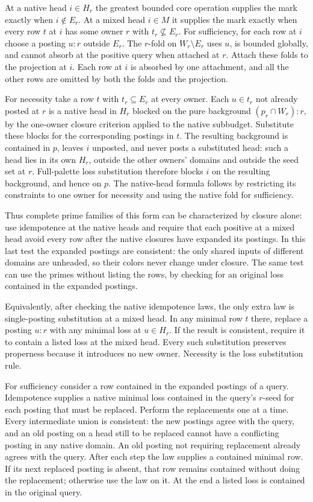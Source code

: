 At a native head $i\in H_r$ the greatest bounded core
operation supplies the mark exactly when $i\notin E_r$.
At a mixed head $i\in M$ it supplies the mark exactly when
every row $t$ at $i$ has some owner $r$ with
$t_r\not\subseteq E_r$. For sufficiency, for each row
at $i$ choose a posting $u:r$ outside $E_r$. The
$r$-fold on $W_r\setminus E_r$ uses $u$, is bounded
globally, and cannot absorb at the positive query when
attached at $r$. Attach these folds to the projection
at $i$. Each row at $i$ is absorbed by one attachment,
and all the other rows are omitted by both the folds
and the projection.

For necessity take a row $t$ with $t_r\subseteq E_r$
at every owner. Each $u\in t_r$ not already posted at $r$
is a native head in $H_r$ blocked on the pure background
$(p_r\cap W_r):r$, by the one-owner closure criterion
applied to the native subbudget. Substitute these
blocks for the corresponding postings in $t$. The
resulting background is contained in $p$, leaves $i$
unposted, and never posts a substituted head: such a
head lies in its own $H_r$, outside the other owners'
domains and outside the seed set at $r$. Full-palette
loss substitution therefore blocks $i$ on the resulting
background, and hence on $p$. The native-head formula
follows by restricting its constraints to one owner for
necessity and using the native fold for sufficiency.

Thus complete prime families of this form can be
characterized by closure alone: use idempotence at the
native heads and require that each positive at a mixed
head avoid every row after the native closures have
expanded its postings. In this last test the expanded
postings are consistent: the only shared inputs of
different domains are unheaded, so their colors never
change under closure. The same test can use the primes
without listing the rows, by checking for an original
loss contained in the expanded postings.

Equivalently, after checking the native idempotence laws,
the only extra law is single-posting substitution at a
mixed head. In any minimal row $t$ there, replace a
posting $u:r$ with any minimal loss at $u\in H_r$.
If the result is consistent, require it to contain a
listed loss at the mixed head. Every such substitution
preserves properness because it introduces no new owner.
Necessity is the loss substitution rule.

For sufficiency consider a row contained in the expanded
postings of a query. Idempotence supplies a native minimal
loss contained in the query's $r$-seed for each posting
that must be replaced. Perform the replacements one at
a time. Every intermediate union is consistent: the new
postings agree with the query, and an old posting on a
head still to be replaced cannot have a conflicting
posting in any native domain. An old posting not requiring
replacement already agrees with the query. After each
step the law supplies a contained minimal row. If its
next replaced posting is absent, that row remains
contained without doing the replacement; otherwise use
the law on it. At the end a listed loss is contained
in the original query.

